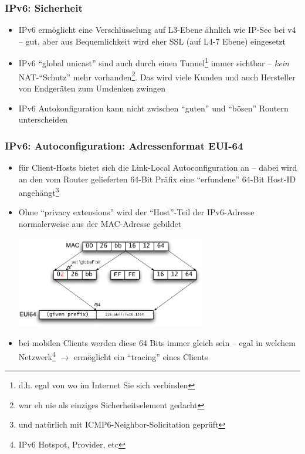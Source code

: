 \documentclass[ignorenonframetext]{beamer}
\begin{document}
\begin{frame}
\frametitle{IPv6: Sicherheit}
\begin{itemize}
	\item IPv6 erm\"oglicht eine Verschl\"usselung auf L3-Ebene \"ahnlich wie IP-Sec bei v4 -- gut, aber aus Bequemlichkeit wird eher SSL (auf L4-7 Ebene) eingesetzt
	\item IPv6 ``global unicast'' sind auch durch einen Tunnel\footnote{d.h. egal von wo im Internet Sie sich verbinden} immer sichtbar -- \emph{kein} NAT-``Schutz'' mehr vorhanden\footnote{war eh nie als einziges Sicherheitselement gedacht}. Das wird viele Kunden und auch Hersteller von Endger\"aten zum Umdenken zwingen
	\item IPv6 Autokonfiguration kann nicht zwischen ``guten'' und ``b\"osen'' Routern unterscheiden
\end{itemize}
\end{frame}


\begin{frame}
\frametitle{IPv6: Autoconfiguration: Adressenformat EUI-64}
\begin{itemize}
  \item f\"ur Client-Hosts bietet sich die Link-Local Autoconfiguration an -- dabei wird an den vom Router gelieferten 64-Bit Pr\"afix eine ``erfundene'' 64-Bit Host-ID angeh\"angt\footnote{und nat\"urlich mit ICMP6-Neighbor-Solicitation gepr\"uft}
  \item Ohne ``privacy extensions'' wird der ``Host''-Teil der IPv6-Adresse normalerweise aus der MAC-Adresse gebildet
  \begin{center}
    \includegraphics[height=4cm]{EUI64.pdf}
  \end{center}
  \item bei mobilen Clients werden diese 64 Bits immer gleich sein -- egal in welchem Netzwerk\footnote{IPv6 Hotspot, Provider, etc} $\rightarrow$ erm\"oglicht ein ``tracing'' eines Clients
\end{itemize}
\end{frame}
\end{document}
